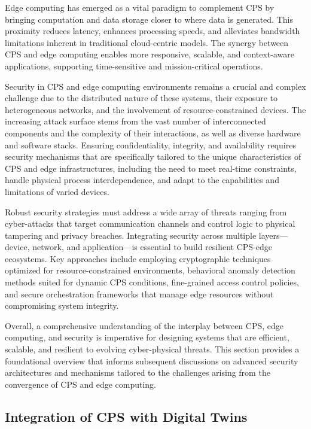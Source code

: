 \documentclass[sigconf]{acmart}
\begin{document}
Edge computing has emerged as a vital paradigm to complement CPS by bringing computation and data storage closer to where data is generated. This proximity reduces latency, enhances processing speeds, and alleviates bandwidth limitations inherent in traditional cloud-centric models. The synergy between CPS and edge computing enables more responsive, scalable, and context-aware applications, supporting time-sensitive and mission-critical operations.

Security in CPS and edge computing environments remains a crucial and complex challenge due to the distributed nature of these systems, their exposure to heterogeneous networks, and the involvement of resource-constrained devices. The increasing attack surface stems from the vast number of interconnected components and the complexity of their interactions, as well as diverse hardware and software stacks. Ensuring confidentiality, integrity, and availability requires security mechanisms that are specifically tailored to the unique characteristics of CPS and edge infrastructures, including the need to meet real-time constraints, handle physical process interdependence, and adapt to the capabilities and limitations of varied devices.

Robust security strategies must address a wide array of threats ranging from cyber-attacks that target communication channels and control logic to physical tampering and privacy breaches. Integrating security across multiple layers—device, network, and application—is essential to build resilient CPS-edge ecosystems. Key approaches include employing cryptographic techniques optimized for resource-constrained environments, behavioral anomaly detection methods suited for dynamic CPS conditions, fine-grained access control policies, and secure orchestration frameworks that manage edge resources without compromising system integrity.

Overall, a comprehensive understanding of the interplay between CPS, edge computing, and security is imperative for designing systems that are efficient, scalable, and resilient to evolving cyber-physical threats. This section provides a foundational overview that informs subsequent discussions on advanced security architectures and mechanisms tailored to the challenges arising from the convergence of CPS and edge computing.

\subsection{Integration of CPS with Digital Twins}
\end{document}
